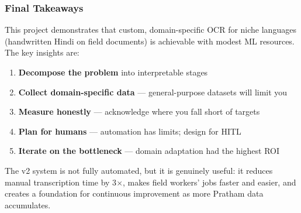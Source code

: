 \documentclass[14pt,a4paper]{article}
\begin{document}
\subsubsection{Final Takeaways}

This project demonstrates that custom, domain-specific OCR for niche languages (handwritten Hindi on field documents) is achievable with modest ML resources. The key insights are:

\begin{enumerate}
    \item \textbf{Decompose the problem} into interpretable stages
    \item \textbf{Collect domain-specific data} --- general-purpose datasets will limit you
    \item \textbf{Measure honestly} --- acknowledge where you fall short of targets
    \item \textbf{Plan for humans} --- automation has limits; design for HITL
    \item \textbf{Iterate on the bottleneck} --- domain adaptation had the highest ROI
\end{enumerate}

The v2 system is not fully automated, but it is genuinely useful: it reduces manual transcription time by 3$\times$, makes field workers' jobs faster and easier, and creates a foundation for continuous improvement as more Pratham data accumulates.

\end{document}
